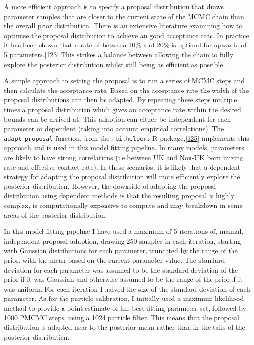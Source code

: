 \documentclass[11pt,twoside]{bristolthesis}
\begin{document}
  A more efficient approach is to specify a proposal distribution that draws parameter samples that are closer to the current state of the MCMC chain than the overall prior distribution. There is an extensive literature examining how to optimise the proposal distribution to achieve an good acceptance rate. In practice it has been shown that a rate of between 10\% and 20\% is optimal for upwards of 5 parameters.{[}\protect\hyperlink{ref-Murray2015}{123}{]} This strikes a balance between allowing the chain to fully explore the posterior distribution whilst still being as efficient as possible.
  
  A simple approach to setting the proposal is to run a series of MCMC steps and then calculate the acceptance rate. Based on the acceptance rate the width of the proposal distributions can then be adapted. By repeating these steps multiple times a proposal distribution which gives an acceptance rate within the desired bounds can be arrived at. This adaption can either be independent for each parameter or dependent (taking into account empirical correlations). The \texttt{adapt\_proposal} function, from the \texttt{rbi.helpers} R package,{[}\protect\hyperlink{ref-Funk:2019uw}{125}{]} implements this approach and is used in this model fitting pipeline. In many models, parameters are likely to have strong correlations (i.e between UK and Non-UK born mixing rate and effective contact rate). In these scenarios, it is likely that a dependent strategy for adapting the proposal distribution will more efficiently explore the posterior distribution. However, the downside of adapting the proposal distribution using dependent methods is that the resulting proposal is highly complex, is computationally expensive to compute and may breakdown in some areas of the posterior distribution.
  
  In this model fitting pipeline I have used a maximum of 5 iterations of, manual, independent proposal adaption, drawing 250 samples in each iteration, starting with Gaussian distributions for each parameter, truncated by the range of the prior, with the mean based on the current parameter value. The standard deviation for each parameter was assumed to be the standard deviation of the prior if it was Gaussian and otherwise assumed to be the range of the prior if it was uniform. For each iteration I halved the size of the standard deviation of each parameter. As for the particle calibration, I initially used a maximum likelihood method to provide a point estimate of the best fitting parameter set, followed by 1000 PMCMC steps, using a 1024 particle filter. This means that the proposal distribution is adapted near to the posterior mean rather than in the tails of the posterior distribution.
  
\end{document}
